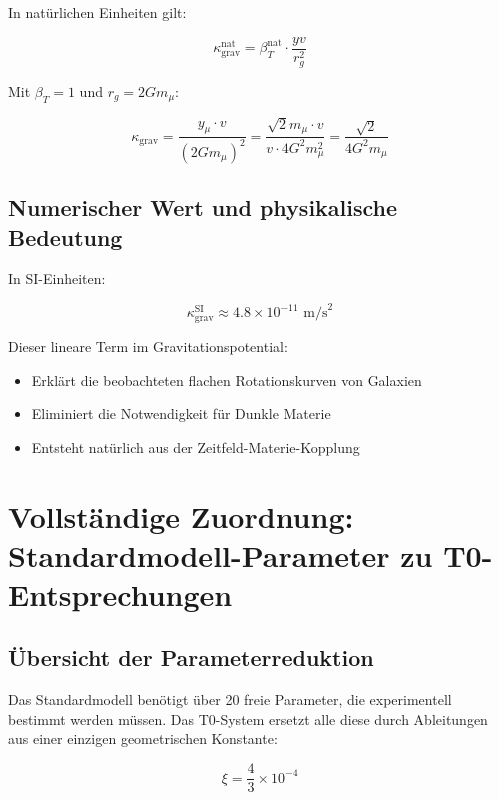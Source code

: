 \documentclass[12pt,a4paper]{article}
\begin{document}
	In natürlichen Einheiten gilt:
	
	\begin{equation}
		\kappa_{\text{grav}}^{\text{nat}} = \beta_T^{\text{nat}} \cdot \frac{yv}{r_g^2}
	\end{equation}
	
	Mit $\beta_T = 1$ und $r_g = 2Gm_\mu$:
	
	\begin{equation}
		\kappa_{\text{grav}} = \frac{y_\mu \cdot v}{(2Gm_\mu)^2} = \frac{\sqrt{2} m_\mu \cdot v}{v \cdot 4G^2m_\mu^2} = \frac{\sqrt{2}}{4G^2m_\mu}
	\end{equation}
	
	\subsection{Numerischer Wert und physikalische Bedeutung}
	
	In SI-Einheiten:
	
	\begin{equation}
		\kappa_{\text{grav}}^{\text{SI}} \approx 4.8 \times 10^{-11} \text{ m/s}^2
	\end{equation}
	
	Dieser lineare Term im Gravitationspotential:
	\begin{itemize}
		\item Erklärt die beobachteten flachen Rotationskurven von Galaxien
		\item Eliminiert die Notwendigkeit für Dunkle Materie
		\item Entsteht natürlich aus der Zeitfeld-Materie-Kopplung
	\end{itemize}
	
\section{Vollständige Zuordnung: Standardmodell-Parameter zu T0-Entsprechungen}
\label{sec:sm_t0_mapping}

\subsection{Übersicht der Parameterreduktion}
\label{subsec:parameter_overview}

Das Standardmodell benötigt über 20 freie Parameter, die experimentell bestimmt werden müssen. Das T0-System ersetzt alle diese durch Ableitungen aus einer einzigen geometrischen Konstante:

\begin{equation}
	\boxed{\xi = \frac{4}{3} \times 10^{-4}}
\end{equation}
\end{document}
